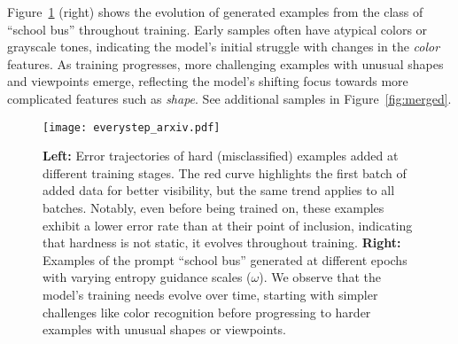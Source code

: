 Figure~\ref{fig:everystep} (right) shows the evolution of generated examples from the class of ``school bus'' throughout training. Early samples often have atypical colors or grayscale tones, indicating the model's initial struggle with changes in the \textit{color} features. As training progresses, more challenging examples with unusual shapes and viewpoints emerge, reflecting the model’s shifting focus towards more complicated features such as \textit{shape}. See additional samples in Figure~\ref{fig:merged}.


\begin{figure}[ht]
    \centering
\texttt{[image: everystep\_arxiv.pdf]}
    \caption{\textbf{Left:} Error trajectories of hard (misclassified) examples added at different training stages. The red curve highlights the first batch of added data for better visibility, but the same trend applies to all batches. Notably, even before being trained on, these examples exhibit a lower error rate than at their point of inclusion, indicating that hardness is not static, it evolves throughout training. \textbf{Right:} Examples of the prompt ``school bus'' generated at different epochs with varying entropy guidance scales (\(\omega\)). We observe that the model's training needs evolve over time, starting with simpler challenges like color recognition before progressing to harder examples with unusual shapes or viewpoints. }
    \label{fig:everystep}
\end{figure}
